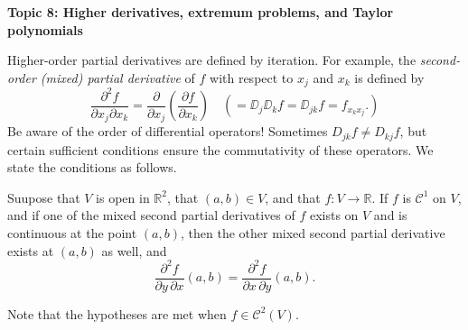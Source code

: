 \documentclass[11pt]{article}
\begin{document}
\begin{center}
  \textbf{Topic 8: Higher derivatives, extremum problems, and Taylor polynomials} 
\end{center}

Higher-order partial derivatives are defined by iteration.  For example, the \textit{second-order (mixed) partial derivative} of $f$ with respect to $x_j$ and $x_k$ is defined by
\[
  \frac{\partial^2 f}{\partial x_j \partial x_k} = \frac{\partial}{\partial x_j} \left( \frac{\partial f}{\partial x_k} \right) \quad ( = \DD_j \DD_k f = \DD_{jk} f = f_{x_k x_j}. )
\]
Be aware of the order of differential operators!  Sometimes $D_{jk} f \ne D_{kj} f$, but certain sufficient conditions ensure the commutativity of these operators.  We state the conditions as follows.

\begin{thm}
  Suupose that $V$ is open in $\mathbb{R}^2$, that $(a,b) \in V$, and that $f : V \to \mathbb{R}$.
  If $f$ is $\mathcal{C}^1$ on $V$, and if one of the mixed second partial derivatives of $f$ exists on $V$ and is continuous at the point $(a,b)$, then the other mixed second partial derivative exists at $(a,b)$ as well, and
  \[
    \frac{\partial^2 f}{\partial y \, \partial x} (a,b) = \frac{\partial^2 f}{\partial x\,\partial y}(a,b).
  \]
\end{thm}
Note that the hypotheses are met when $f \in \mathcal{C}^2(V)$.
\end{document}

